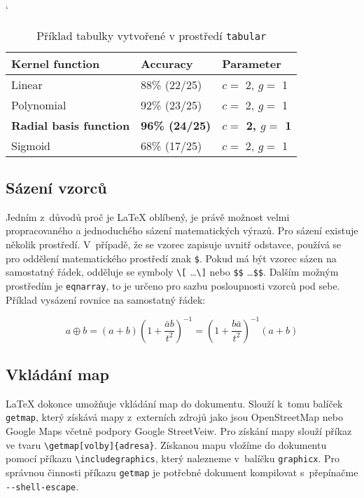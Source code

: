 \documentclass[11pt, a4paper]{article}
\begin{document}
\renewcommand{\arraystretch}{1.5}
\begin{table}[h!] \catcode`
\setlength\arrayrulewidth{1pt}
\small
\centering
    \begin{tabular}{|C{3.5cm}|C{2cm}|C{3.5cm}|}\hline
         Kernel function &
         Accuracy &
         Parameter \\ \hline
         Linear & 88\% (22/25) & $c =$ 2, $g =$ 1\\ \hline
         Polynomial & 92\% (23/25) & $c =$ 2, $g =$ 1\\ \hline
         \textbf{Radial basis function} & \textbf{96\% (24/25)} & \textbf{$c =$ 2, $g =$ 1}\\ \hline
         Sigmoid & 68\% (17/25) & $c =$ 2, $g =$ 1\\ \hline
    \end{tabular}
    \caption{Příklad tabulky vytvořené v prostředí \texttt{tabular} \cite{article:table}} 
\end{table}
\renewcommand{\arraystretch}{1}


\subsection{Sázení vzorců}
Jedním z~důvodů proč je \LaTeX{} oblíbený, je právě možnost velmi propracovaného a jednoduchého sázení matematických výrazů. Pro sázení existuje několik prostředí.\cite{book:rybicka}
V~případě, že se vzorec zapisuje uvnitř odstavce, používá se pro oddělení matematického prostředí znak \verb|$|. Pokud má být vzorec sázen na samostatný řádek, odděluje se symboly \verb|\[| \dots \verb|\]| nebo \verb|$$| \dots \verb|$$|. Dalším možným prostředím je \verb|eqnarray|, to je určeno pro sazbu posloupnosti vzorců pod sebe.\cite{web:math} Příklad vysázení rovnice na samostatný řádek\cite{article:math}:

$$
a \oplus b = 
(a + b)\left(1+ \frac{\bar{a}b}{t^2}\right)^{-1} = 
\left(1+ \frac{b\bar{a}}{t^2}\right)^{-1} (a+b)
$$


\subsection{Vkládání map}
\LaTeX{} dokonce umožňuje vkládání map do dokumentu. Slouží k~tomu balíček \verb|getmap|, který získává mapy z~externích zdrojů jako jsou OpenStreetMap nebo Google Maps včetně podpory Google StreetVeiw. 
Pro získání mapy slouží příkaz ve tvaru \verb|\getmap[volby]{adresa}|. Získanou mapu vložíme do dokumentu pomocí příkazu \verb|\includegraphics|, který nalezneme v~balíčku \verb|graphicx|. Pro správnou činnosti příkazu \verb|getmap| je potřebné dokument kompilovat s~přepínačme \verb|--shell-escape|.\cite{article:map}
\end{document}
